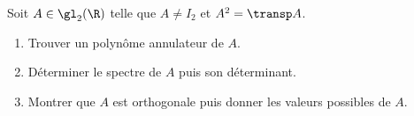 \begin{enonce}
\begin{exercise}[ID={RMS 122-2 E1220 CCP PSI},subtitle={},tags={}, difficulty={0}]
  Soit $A\in\gl_2(\R)$ telle que $A\neq I_2$ et $A^2=\transp A$.
  \begin{enumerate}
    \item Trouver un polynôme annulateur de $A$.
    \item Déterminer le spectre de $A$ puis son déterminant.
    \item Montrer que $A$ est orthogonale puis donner les valeurs possibles de $A$.
  \end{enumerate}
\end{exercise}
\begin{solution}
\end{solution}
\end{enonce}
